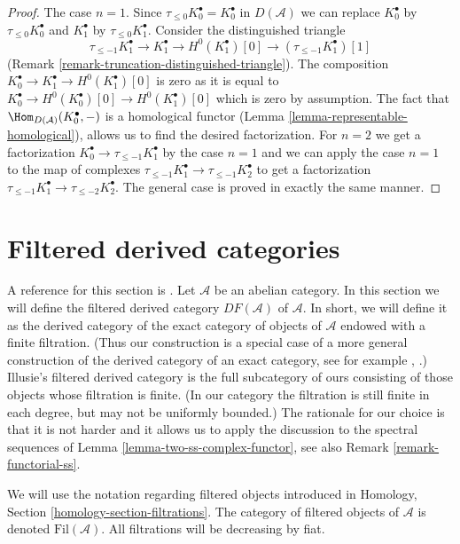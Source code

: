 \begin{proof}
The case $n = 1$. Since $\tau_{\leq 0}K_0^\bullet = K_0^\bullet$
in $D(\mathcal{A})$ we can replace
$K_0^\bullet$ by $\tau_{\leq 0}K_0^\bullet$ and
$K_1^\bullet$ by $\tau_{\leq 0}K_1^\bullet$.
Consider the distinguished triangle
$$
\tau_{\leq -1}K_1^\bullet \to K_1^\bullet \to
H^0(K_1^\bullet)[0] \to (\tau_{\leq -1}K_1^\bullet)[1]
$$
(Remark \ref{remark-truncation-distinguished-triangle}).
The composition $K_0^\bullet \to K_1^\bullet \to H^0(K_1^\bullet)[0]$
is zero as it is equal to $K_0^\bullet \to H^0(K_0^\bullet)[0] \to
H^0(K_1^\bullet)[0]$ which is zero by assumption.
The fact that $\Hom_{D(\mathcal{A})}(K_0^\bullet, -)$
is a homological functor (Lemma \ref{lemma-representable-homological}),
allows us to find the desired factorization.
For $n = 2$ we get a factorization
$K_0^\bullet \to \tau_{\leq -1}K_1^\bullet$ by the case $n = 1$
and we can apply the case $n = 1$ to the map of complexes
$\tau_{\leq -1}K_1^\bullet \to \tau_{\leq -1}K_2^\bullet$
to get a factorization
$\tau_{\leq -1}K_1^\bullet \to \tau_{\leq -2}K_2^\bullet$.
The general case is proved in exactly the same manner.
\end{proof}




\section{Filtered derived categories}
\label{section-filtered-derived-category}

\noindent
A reference for this section is \cite[I, Chapter V]{cotangent}. Let
$\mathcal{A}$ be an abelian category. In this section we will define the
filtered derived category $DF(\mathcal{A})$ of $\mathcal{A}$.
In short, we will define it as the derived category
of the exact category of objects of $\mathcal{A}$ endowed with a finite
filtration. (Thus our construction is a special case of a
more general construction of the derived category of an
exact category, see for example \cite{Buhler}, \cite{Keller}.)
Illusie's filtered derived category is the full subcategory
of ours consisting of those objects whose filtration is finite.
(In our category the filtration is still finite in each degree, but may
not be uniformly bounded.) The rationale for our choice is that it is not
harder and it allows us to apply the discussion to the spectral sequences of
Lemma \ref{lemma-two-ss-complex-functor}, see also
Remark \ref{remark-functorial-ss}.

\medskip\noindent
We will use the notation regarding filtered objects introduced in
Homology, Section \ref{homology-section-filtrations}.
The category of filtered objects of $\mathcal{A}$ is
denoted $\text{Fil}(\mathcal{A})$.
All filtrations will be decreasing by fiat.

